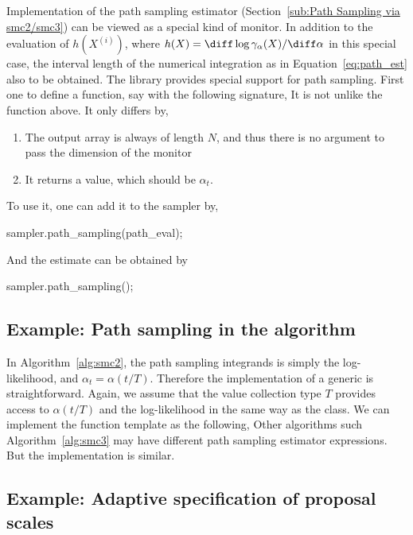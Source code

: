 Implementation of the path sampling estimator (Section~\ref{sub:Path Sampling via smc2/smc3}) can be viewed as a special kind of monitor. In addition to the evaluation of $h(X^{(i)})$, where $h(X) = \diff\log\gamma_{\alpha}(X)/\diff\alpha$ in this special case, the interval length of the numerical integration as in Equation~\eqref{eq:path_est} also  to be obtained. The \vsmc library provides special support for path sampling. First one  to define a function, say  with the following signature,
It is not unlike the  function above. It only differs by,
\begin{enumerate}
  \item The output array  is always of length $N$, and thus there is no argument to pass the dimension of the monitor
  \item It returns a value, which should be $\alpha_t$.
\end{enumerate}
To use it, one can add it to the sampler by,
\begin{cppcode}
sampler.path_sampling(path_eval);
\end{cppcode}
And the estimate can be obtained by
\begin{cppcode}
sampler.path_sampling();
\end{cppcode}

\subsection{Example: Path sampling in the \smc[2] algorithm}
\label{sub:Example: Path sampling with the SMC2 algorithm}

In Algorithm~\ref{alg:smc2}, the path sampling integrands is simply the log-likelihood, and $\alpha_t = \alpha(t/T)$. Therefore the implementation of a generic  is straightforward. Again, we assume that the value collection type $T$ provides access to $\alpha(t/T)$ and the log-likelihood in the same way as the  class. We can implement the function template as the following,
Other \smc algorithms such Algorithm~\ref{alg:smc3} may have different path sampling estimator expressions. But the implementation is similar.

\subsection{Example: Adaptive specification of proposal scales}
\label{sub:Example: Adaptive specification of proposal scales}

